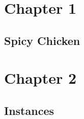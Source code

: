 
\appendix
{}

\chapter{Chapter 1}

\section{Spicy Chicken}
\label{sec:spicychicken}



\chapter{Chapter 2}
\section{Instances}
\label{appdx:instances-samples}

